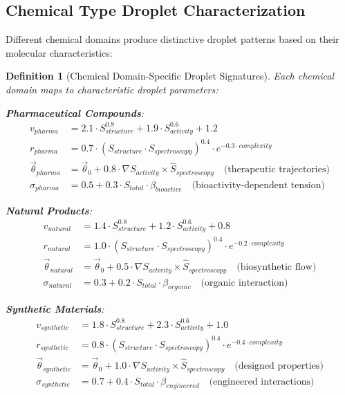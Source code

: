 \documentclass[12pt,a4paper]{article}
\newtheorem{definition}{Definition}
\begin{document}
\begin{algorithm}
\begin{algorithmic}[1]
\subsection{Chemical Type Droplet Characterization}

Different chemical domains produce distinctive droplet patterns based on their molecular characteristics:

\begin{definition}[Chemical Domain-Specific Droplet Signatures]
Each chemical domain maps to characteristic droplet parameters:

\textbf{Pharmaceutical Compounds}:
\begin{align}
v_{pharma} &= 2.1 \cdot S_{structure}^{0.8} + 1.9 \cdot S_{activity}^{0.6} + 1.2 \\
r_{pharma} &= 0.7 \cdot (S_{structure} \cdot S_{spectroscopy})^{0.4} \cdot e^{-0.3 \cdot complexity} \\
\vec{\theta}_{pharma} &= \vec{\theta}_0 + 0.8 \cdot \nabla S_{activity} \times \hat{S}_{spectroscopy} \quad \text{(therapeutic trajectories)} \\
\sigma_{pharma} &= 0.5 + 0.3 \cdot S_{total} \cdot \beta_{bioactive} \quad \text{(bioactivity-dependent tension)}
\end{align}

\textbf{Natural Products}:
\begin{align}
v_{natural} &= 1.4 \cdot S_{structure}^{0.8} + 1.2 \cdot S_{activity}^{0.6} + 0.8 \\
r_{natural} &= 1.0 \cdot (S_{structure} \cdot S_{spectroscopy})^{0.4} \cdot e^{-0.2 \cdot complexity} \\
\vec{\theta}_{natural} &= \vec{\theta}_0 + 0.5 \cdot \nabla S_{activity} \times \hat{S}_{spectroscopy} \quad \text{(biosynthetic flow)} \\
\sigma_{natural} &= 0.3 + 0.2 \cdot S_{total} \cdot \beta_{organic} \quad \text{(organic interaction)}
\end{align}

\textbf{Synthetic Materials}:
\begin{align}
v_{synthetic} &= 1.8 \cdot S_{structure}^{0.8} + 2.3 \cdot S_{activity}^{0.6} + 1.0 \\
r_{synthetic} &= 0.8 \cdot (S_{structure} \cdot S_{spectroscopy})^{0.4} \cdot e^{-0.4 \cdot complexity} \\
\vec{\theta}_{synthetic} &= \vec{\theta}_0 + 1.0 \cdot \nabla S_{activity} \times \hat{S}_{spectroscopy} \quad \text{(designed properties)} \\
\sigma_{synthetic} &= 0.7 + 0.4 \cdot S_{total} \cdot \beta_{engineered} \quad \text{(engineered interactions)}
\end{align}
\end{definition}


\end{algorithmic}
\end{algorithm}
\end{document}
